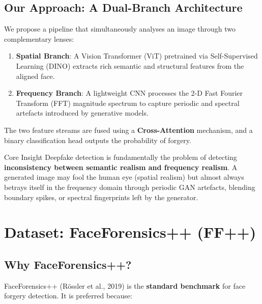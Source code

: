 \documentclass[12pt,a4paper]{article}
\begin{document}
\subsection{Our Approach: A Dual-Branch Architecture}

We propose a pipeline that simultaneously analyses an image through two complementary
lenses:

\begin{enumerate}[leftmargin=1.5em]
  \item \textbf{Spatial Branch}: A Vision Transformer (ViT) pretrained via Self-Supervised
    Learning (DINO) extracts rich semantic and structural features from the aligned face.
  \item \textbf{Frequency Branch}: A lightweight CNN processes the 2-D Fast Fourier
    Transform (FFT) magnitude spectrum to capture periodic and spectral artefacts
    introduced by generative models.
\end{enumerate}

The two feature streams are fused using a \textbf{Cross-Attention} mechanism, and a
binary classification head outputs the probability of forgery.

\begin{insightbox}{Core Insight}
Deepfake detection is fundamentally the problem of detecting
\textbf{inconsistency between semantic realism and frequency realism}. A generated image
may fool the human eye (spatial realism) but almost always betrays itself in the frequency
domain through periodic GAN artefacts, blending boundary spikes, or spectral fingerprints
left by the generator.
\end{insightbox}

\newpage

\section{Dataset: FaceForensics++ (FF++)}

\subsection{Why FaceForensics++?}

FaceForensics++ (R\"{o}ssler et al., 2019) is the \textbf{standard benchmark} for
face forgery detection. It is preferred because:
\end{document}
